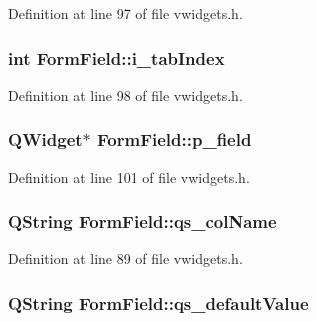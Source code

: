 Definition at line 97 of file vwidgets.h.

\hypertarget{classFormField_ac4fd32b1bbf15117330290e4116e552a}{
\subsubsection[{i\_\-tabIndex}]{\setlength{\rightskip}{0pt plus 5cm}int {\bf FormField::i\_\-tabIndex}}}
\label{classFormField_ac4fd32b1bbf15117330290e4116e552a}


Definition at line 98 of file vwidgets.h.

\hypertarget{classFormField_ab7f3ad82c182c8a4989713f3f1816184}{
\subsubsection[{p\_\-field}]{\setlength{\rightskip}{0pt plus 5cm}QWidget$\ast$ {\bf FormField::p\_\-field}}}
\label{classFormField_ab7f3ad82c182c8a4989713f3f1816184}


Definition at line 101 of file vwidgets.h.

\hypertarget{classFormField_ad05d2212596727bd118e8b2c1f57f7b7}{
\subsubsection[{qs\_\-colName}]{\setlength{\rightskip}{0pt plus 5cm}QString {\bf FormField::qs\_\-colName}}}
\label{classFormField_ad05d2212596727bd118e8b2c1f57f7b7}


Definition at line 89 of file vwidgets.h.

\hypertarget{classFormField_aa2bdc2d8032046b7ed7645c8a8e21ba2}{
\subsubsection[{qs\_\-defaultValue}]{\setlength{\rightskip}{0pt plus 5cm}QString {\bf FormField::qs\_\-defaultValue}}}
\label{classFormField_aa2bdc2d8032046b7ed7645c8a8e21ba2}


